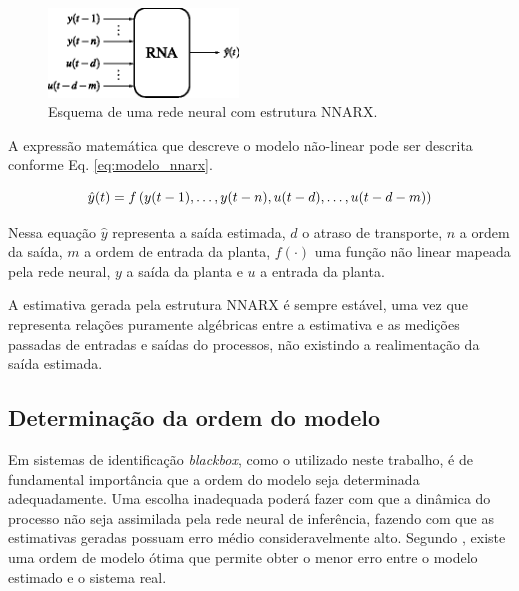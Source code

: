 \begin{figure}[htb]
\centering
\includegraphics[width=0.45\textwidth]{imgs/rnas/eps/nnarx}
\caption{Esquema de uma rede neural com estrutura NNARX.}
\label{fig:nnarx}
\end{figure}


A expressão matemática que descreve o modelo não-linear pode ser descrita
conforme Eq. \ref{eq:modelo_nnarx}.

\begin{equation}
\label{eq:modelo_nnarx}
\hat{y}(t) = f\left(y(t-1), \ldots, y(t-n), u(t-d), \ldots, u(t-d-m)\right)
\end{equation}


Nessa equação $\hat{y}$ representa a saída estimada, $d$ o atraso de transporte,
$n$ a ordem da saída, $m$ a ordem de entrada da planta, $f( \cdotp )$ uma função
não linear mapeada pela rede neural, $y$ a saída da planta e $u$ a entrada da
planta.

A estimativa gerada pela estrutura NNARX é sempre estável, uma vez que
representa relações puramente algébricas entre a estimativa e as medições
passadas de entradas e saídas do processos, não existindo a realimentação da
saída estimada.

\subsection{Determinação da ordem do modelo}
\label{sec:det_ordem}
Em sistemas de identificação {\it blackbox}, como o utilizado neste trabalho, é
de fundamental importância que a ordem do modelo seja determinada adequadamente.
Uma escolha inadequada poderá fazer com que a dinâmica do processo não seja
assimilada pela rede neural de inferência, fazendo com que as estimativas
geradas possuam erro médio consideravelmente alto. Segundo
, existe uma ordem de modelo ótima que permite obter o
menor erro entre o modelo estimado e o sistema real.

